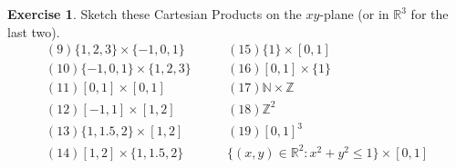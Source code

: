 \documentclass{article}
\theoremstyle{definition}
\newtheorem{exercise}{Exercise}[section]
\newcommand{\R}{\mathbb{R}}
\newcommand{\N}{\mathbb{N}}
\newcommand{\Z}{\mathbb{Z}}
\begin{document}
\begin{exercise}
    Sketch these Cartesian Products on the $xy$-plane (or in $\R^3$ for the last two).
    $$
    \begin{aligned}
        (9) \{ 1,2,3 \}\times \{ -1,0,1 \} &\quad\quad (15) \{ 1 \}\times [0,1]\\
        (10) \{ -1,0,1 \}\times \{ 1,2,3 \} &\quad\quad (16) [0,1]\times \{ 1 \}\\
        (11) [0,1]\times[0,1] &\quad\quad (17) \N\times\Z\\
        (12) [-1,1]\times [1,2] &\quad\quad (18) \Z^2\\
        (13) \{ 1,1.5,2 \}\times[1,2] &\quad\quad (19) [0,1]^3\\
        (14) [1,2]\times \{ 1,1.5,2 \} &\quad\quad \{ (x,y)\in\R^2:x^2+y^2\le 1 \}\times[0,1]
    \end{aligned}
    $$
\end{exercise}
\end{document}
